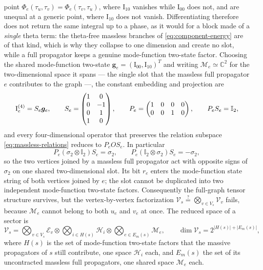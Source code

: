 \documentclass[11pt,a4paper]{article}
\numberwithin{table}{section}
\newcommand{\Id}{\mathbb I}
\newcommand{\cV}{\mathcal V}
\newcommand{\cE}{\mathcal E}
\newcommand{\cH}{\mathcal H}
\newcommand{\cM}{\mathcal M}
\begin{document}
point $\Phi_e(\tau_u,\tau_v)=\Phi_e(\tau_v,\tau_u)$, where $\text{I}_{10}$ vanishes while
$\text{I}_{00}$ does not, and are unequal at a generic point, where $\text{I}_{10}$ does not vanish.
Differentiating therefore does not return the same integral up to a phase, as it would for a block
made of a \emph{single} theta term: the theta-free massless branches of
\eqref{eq:component-energy} are of that kind, which is why they collapse to one dimension and create
no slot, while a full propagator keeps a genuine mode-function two-state factor. Choosing the shared mode-function two-state
$\bm g_e=(\text{I}_{00},\text{I}_{10})^T$ and writing $\cM_e\simeq\mathbb C^2$ for the
two-dimensional space it spans --- the single slot that the massless full propagator $e$
contributes to the graph ---, the constant embedding and
projection are
\begin{equation}
  \bm{\text I}^{(4)}_e=S_e\bm g_e,\qquad
  S_e=\begin{pmatrix}1&0\\0&-1\\0&1\\1&0\end{pmatrix},\qquad
  P_e=\begin{pmatrix}1&0&0&0\\0&0&1&0\end{pmatrix},\qquad
  P_eS_e=\Id_2,
  \label{eq:SP-massless}
\end{equation}
and every four-dimensional operator that preserves the relation subspace \eqref{eq:massless-relations}
reduces to $P_eOS_e$. In particular
\begin{equation}
  P_e(\sigma_2\otimes\Id_2)S_e=\sigma_2,
  \qquad
  P_e(\Id_2\otimes\sigma_2)S_e=-\sigma_2,
  \label{eq:endpoint-projections}
\end{equation}
so the two vertices joined by a massless full propagator act with opposite signs of $\sigma_2$
on one shared two-dimensional slot. Its bit $r_e$ enters the mode-function state string of both
vertices joined by $e$; the slot cannot be duplicated into two independent mode-function two-state factors. Consequently the full-graph tensor structure survives, but
the vertex-by-vertex factorization
$\cV_s\stackrel{?}{=}\bigotimes_{v\in V_s}\cV_v$ fails, because $\cM_e$ cannot belong to both $u_e$
and $v_e$ at once. The reduced space of a sector is
\begin{equation}
  \cV_s=\bigotimes_{v\in V_s}\cE_v
  \otimes\bigotimes_{i\in H(s)}\cH_i
  \otimes\bigotimes_{e\in E_m(s)}\cM_e,
  \qquad \dim\cV_s=2^{|H(s)|+|E_m(s)|},
  \label{eq:reduced-space}
\end{equation}
where $H(s)$ is the set of mode-function two-state factors that the massive propagators of $s$ still
contribute, one space $\cH_i$ each, and $E_m(s)$ the set of its uncontracted massless full
propagators, one shared space $\cM_e$ each.
\end{document}
